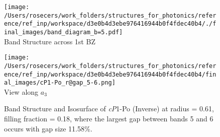 \begin{figure}[H]
\begin{minipage}{0.5\textwidth}\centering
\texttt{[image: /Users/rosecers/work\_folders/structures\_for\_photonics/reference/ref\_inp/workspace/d3e0b4d3ebe976416944b0f4fdec40b4/./final\_images/band\_diagram\_b=5.pdf]}
\\Band Structure across 1st BZ
\end{minipage}\hfill
\begin{minipage}{0.48\textwidth}\centering
\texttt{[image: /Users/rosecers/work\_folders/structures\_for\_photonics/reference/ref\_inp/workspace/d3e0b4d3ebe976416944b0f4fdec40b4/final\_images/cP1-Po\_r@gap\_5-6.png]}
\\View along $a_3$ 
\end{minipage}\hfill\caption{Band Structure and Isosurface of \textit{cP}1-Po (Inverse) at radius = 0.61, filling fraction = 0.18, where the largest gap between bands 5 and 6 occurs with gap size 11.58\%.}

\end{figure}
\vspace{-0.25in}

